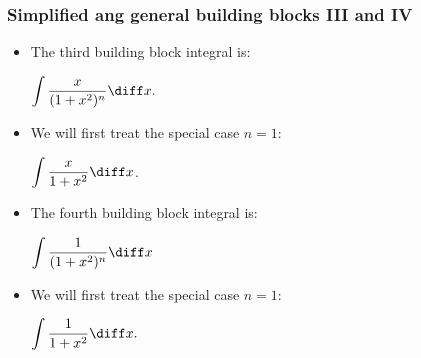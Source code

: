 \begin{frame}
\frametitle{Simplified ang general building blocks III and IV}
\begin{itemize}
\item The third building block integral is: 

$\displaystyle \int \frac{x}{(1+x^2)^n }\diff x.$

\item We will first treat the special case $n=1$:

$\displaystyle \int \frac{x}{1+x^2 }\diff x$. 
\item The fourth building block integral is:

$\displaystyle \int \frac{1}{(1+x^2)^n }\diff x$
\item  We will first treat the special case $n=1$:

$\displaystyle \int \frac{1}{1+x^2 }\diff x.$
\end{itemize}

\end{frame}
